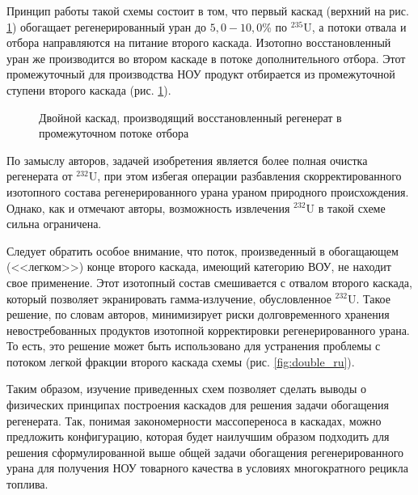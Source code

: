 Принцип работы такой схемы состоит в том, что первый каскад (верхний на рис. \ref{fig:double_crazy}) обогащает регенерированный уран до $5,0-10,0$\% по $^{235}$U, а потоки отвала и отбора направляются на питание второго каскада.
Изотопно восстановленный уран же производится во втором каскаде в потоке дополнительного отбора.
Этот промежуточный для производства НОУ продукт отбирается из промежуточной ступени второго каскада (рис. \ref{fig:double_crazy}).
\begin{figure}[ht]
  \caption{Двойной каскад, производящий восстановленный регенерат в промежуточном потоке отбора}\label{fig:double_crazy}
\end{figure}

По замыслу авторов, задачей изобретения является более полная очистка регенерата от $^{232}$U, при этом избегая операции разбавления скорректированного изотопного состава регенерированного урана ураном природного происхождения.
Однако, как и отмечают авторы, возможность извлечения $^{232}$U в такой схеме сильна ограничена.

Следует обратить особое внимание, что поток, произведенный в обогащающем (<<легком>>) конце второго каскада, имеющий категорию ВОУ, не находит свое применение.
Этот изотопный состав смешивается с отвалом второго каскада, который позволяет экранировать гамма-излучение, обусловленное $^{232}$U.
Такое решение, по словам авторов, минимизирует риски долговременного хранения невостребованных продуктов изотопной корректировки регенерированного урана.
То есть, это решение может быть использовано для устранения проблемы с потоком легкой фракции второго каскада схемы (рис. \ref{fig:double_ru}).


Таким образом, изучение приведенных схем позволяет сделать выводы о физических принципах построения каскадов для решения задачи обогащения регенерата. 
Так, понимая закономерности массопереноса в каскадах, можно предложить конфигурацию, которая будет наилучшим образом подходить для решения сформулированной выше общей задачи обогащения регенерированного урана для получения НОУ товарного качества в условиях многократного рецикла топлива.

